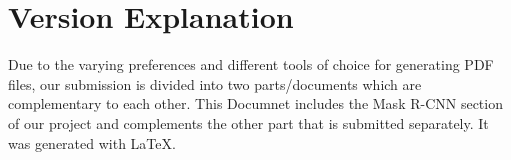 
\section*{Version Explanation}
 
Due to the varying preferences and different tools of choice for generating PDF files, our submission is divided into two parts/documents which are complementary to each other. This Documnet includes the Mask R-CNN section of our project and complements the other part that is submitted separately. It was generated with LaTeX.

